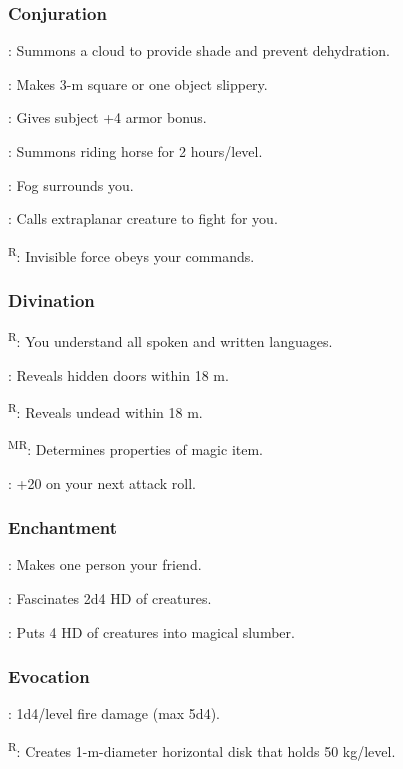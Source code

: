 \subsubsection{Conjuration}
	: Summons a cloud to provide shade and prevent dehydration. %

	: Makes 3-m square or one object slippery.

	: Gives subject +4 armor bonus.

	: Summons riding horse for 2 hours/level.

	: Fog surrounds you.

	: Calls extraplanar creature to fight for you.

	\textsuperscript{R}: Invisible force obeys your commands.

\subsubsection{Divination}
	\textsuperscript{R}: You understand all spoken and written languages.

	: Reveals hidden doors within 18 m.

	\textsuperscript{R}: Reveals undead within 18 m.

	\textsuperscript{MR}: Determines properties of magic item.

	: +20 on your next attack roll.

\subsubsection{Enchantment}
	: Makes one person your friend.

	: Fascinates 2d4 HD of creatures.

	: Puts 4 HD of creatures into magical slumber.

\subsubsection{Evocation}
	: 1d4/level fire damage (max 5d4).

	\textsuperscript{R}: Creates 1-m-diameter horizontal disk that holds 50 kg/level.

